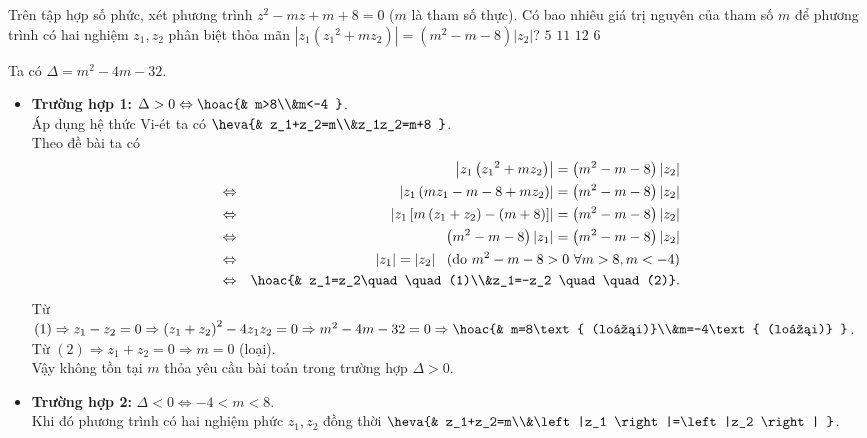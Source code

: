 \begin{ex}%
Trên tập hợp số phức, xét phương trình $z^2-mz+m+8=0$ ($m$ là tham số thực). Có bao nhiêu giá trị nguyên của tham số $m$ để phương trình có hai nghiệm $z_1,z_2$ phân biệt thỏa mãn $\left |z_1\left ({z_1}^2+mz_2 \right ) \right |=\left (m^2-m-8 \right )\left |z_2 \right |$?
\choice 
{\True $5$} 
{$11$}
{$12$} 
{$6$}
\loigiai
{
Ta có $\Delta =m^2-4m-32$.
\begin{itemize}
\item\textbf{Trường hợp 1:} $\Delta >0\Leftrightarrow\hoac{& m>8\\&m<-4 }$.\\
Áp dụng hệ thức Vi-ét ta có $\heva{& z_1+z_2=m\\&z_1z_2=m+8 }$.\\
Theo đề bài ta có 
\begin{eqnarray*}
&&\left |z_1\left ({z_1}^2+mz_2 \right ) \right |=\left (m^2-m-8 \right )\left |z_2 \right |\\
&\Leftrightarrow &\left |z_1\left (mz_1-m-8+mz_2 \right ) \right |=\left (m^2-m-8 \right )\left |z_2 \right |\\
&\Leftrightarrow &\left |z_1\left [m\left (z_1+z_2 \right )-(m+8) \right ] \right |=\left (m^2-m-8 \right )\left |z_2 \right |\\
&\Leftrightarrow &\left (m^2-m-8 \right )\left |z_1 \right |=\left (m^2-m-8 \right )\left |z_2 \right |\\
&\Leftrightarrow &\left |z_1 \right |=\left |z_2 \right |\,\,\text{ (do }m^2-m-8>0\,\,\forall m>8,m<-4)\\
&\Leftrightarrow &\hoac{& z_1=z_2\quad\quad (1)\\&z_1=-z_2 \quad \quad (2)}.
\end{eqnarray*}
Từ $(1)\Rightarrow z_1-z_2=0\Rightarrow\left (z_1+z_2 \right )^2-4z_1z_2=0\Rightarrow m^2-4m-32=0\Rightarrow\hoac{& m=8\text{ (loại)}\\&m=-4\text{ (loại)} }$.\\
Từ $(2)\Rightarrow z_1+z_2=0\Rightarrow m=0$ (loại).\\
Vậy không tồn tại $m$ thỏa yêu cầu bài toán trong trường hợp $\Delta >0$.
\item\textbf{Trường hợp 2:} $\Delta <0\Leftrightarrow -4<m<8$. \\Khi đó phương trình có hai nghiệm phức $z_1,z_2$ đồng thời $\heva{& z_1+z_2=m\\&\left |z_1 \right |=\left |z_2 \right | }$.\\

\end{itemize}}
\end{ex}
